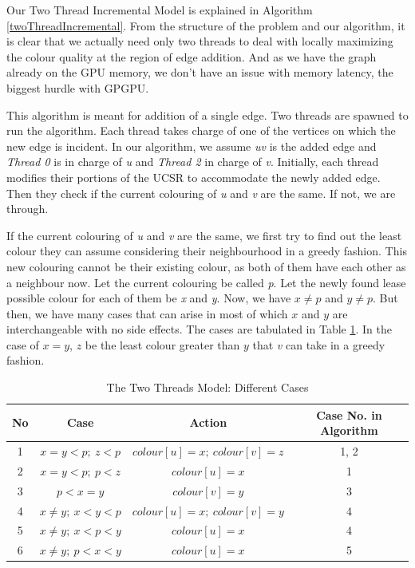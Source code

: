 \documentclass[MTech]{iitmdiss}
\begin{document}
Our Two Thread Incremental Model is explained in Algorithm \ref{twoThreadIncremental}. From the structure of the problem and our algorithm, it is clear that we actually need only two threads to deal with locally maximizing the colour quality at the region of edge addition. And as we have the graph already on the GPU memory, we don't have an issue with memory latency, the biggest hurdle with GPGPU.

This algorithm is meant for addition of a single edge. Two threads are spawned to run the algorithm. Each thread takes charge of one of the vertices on which the new edge is incident. In our algorithm, we assume \textit{uv} is the added edge and \textit{Thread 0} is in charge of \textit{u} and \textit{Thread 2} in charge of \textit{v}. Initially, each thread modifies their portions of the UCSR to accommodate the newly added edge. Then they check if the current colouring of \textit{u} and \textit{v} are the same. If not, we are through.

If the current colouring of \textit{u} and \textit{v} are the same, we first try to find out the least colour they can assume considering their neighbourhood in a greedy fashion. This new colouring cannot be their existing colour, as both of them have each other as a neighbour now. Let the current colouring be called \textit{p}. Let the newly found lease possible colour for each of them be \textit{x} and \textit{y}. Now, we have $x \neq p$ and $y \neq p$. But then, we have many cases that can arise in most of which $x$ and $y$ are interchangeable with no side effects. The cases are tabulated in Table \ref{table:3}. In the case of $x=y$, $z$ be the least colour greater than $y$ that \textit{v} can take in a greedy fashion. 

\begin{table}[h!]
\centering
\begin{tabular}{||c|c|c|c||} 
 \hline
 No & Case & Action & Case No. in Algorithm \\ [0.5ex] 
 \hline\hline
1 & $x=y < p; \: z<p$ & $colour[u]=x; \: colour[v]=z$ & 1, 2 \\
\hline
2 & $x=y < p; \: p<z$ & $colour[u]=x$ & 1\\
\hline
3 & $p < x=y$ & $colour[v]=y$ & 3\\
\hline
4 & $x \neq y; \: x < y < p$ & $colour[u]=x; \: colour[v]=y$ & 4\\
\hline
5 & $x \neq y; \: x < p < y$ & $colour[u]=x$ & 4\\
\hline
6 & $x \neq y; \: p < x < y$ & $colour[u]=x$& 5\\
\hline
\end{tabular}
\caption{The Two Threads Model: Different Cases}
\label{table:3}
\end{table}
\end{document}
